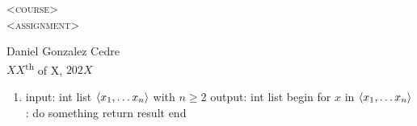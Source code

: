 \documentclass[12pt, a4paper]{article}
\theoremstyle{thm}%
\theoremstyle{dfn}%
\theoremstyle{rmk}%
\renewcommand{\geq}{\geqslant}
\DeclarePairedDelimiter \brackets{\langle}{\rangle}
\begin{document}
\begin{center}
    \textsc{\huge <course>}\\
    \textsc{\large <assignment>}\\
\end{center}
\begin{flushright}
    Daniel Gonzalez Cedre\\
    $XX$\textsuperscript{th} of X, $202X$
\end{flushright}

\begin{enumerate}
    \item
\begin{algorithm}[caption={placeholder}, label={alg:placeholder}]
    input:  int list $\brackets*{x_1, \dots x_n}$ with $n \geq 2$
    output: int list
    begin
        for $x$ in $\brackets*{x_1, \dots x_n}$:
            do something
        return result
    end
\end{algorithm}

\end{enumerate}
\end{document}
